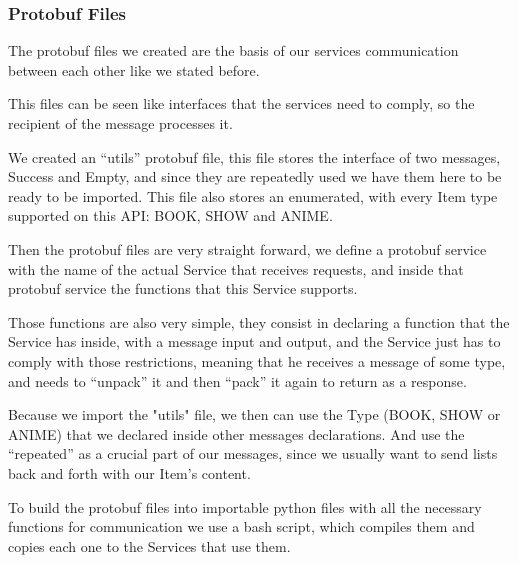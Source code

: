 \documentclass[oneside]{article}
\newcommand*\fpar{\hspace{1ex}}
\begin{document}
    \subsubsection{Protobuf Files}
    \fpar The protobuf files we created are the basis of our services communication between each other like we stated before.
    \par This files can be seen like interfaces that the services need to comply, so the recipient of the message processes it.
    \par We created an “utils” protobuf file, this file stores the interface of two messages, Success and Empty, and since they are repeatedly used we have them here to be ready to be imported. This file also stores an enumerated, with every Item type supported on this API: BOOK, SHOW and ANIME.
    \par Then the protobuf files are very straight forward, we define a protobuf service with the name of the actual Service that receives requests, and inside that protobuf service the functions that this Service supports.
    \par Those functions are also very simple, they consist in declaring a function that the Service has inside, with a message input and output, and the Service just has to comply with those restrictions, meaning that he receives a message of some type, and needs to “unpack” it and then “pack” it again to return as a response.
    \par Because we import the "utils" file, we then can use the Type (BOOK, SHOW or ANIME) that we declared inside other messages declarations. And use the “repeated” as a crucial part of our messages, since we usually want to send lists back and forth with our Item's content.
    \par To build the protobuf files into importable python files with all the necessary functions for communication we use a bash script, which compiles them and copies each one to the Services that use them.
      
\end{document}
